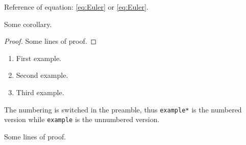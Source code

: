 \documentclass[a4paper, 11pt,
  use osf,
  use style = stream,
  title in boldface,
  theorem in new line,
  emphasize theorems,
  theorem numbering = section,
  simple name,  %
  name in link, %
]{einfart}
\numberwithin{equation}{section}
\begin{document}
\begin{emphasis}
    Reference of equation: \eqref{eq:Euler} or \cref{eq:Euler}.
\end{emphasis}

\begin{corollary}\label{cor:result}
    Some corollary.
\end{corollary}
\begin{proof}
    Some lines of proof.
\end{proof}

\begin{examples}
    \begin{enumerate}
        \item First example.
        \item Second example.
        \item Third example.
    \end{enumerate}
\end{examples}

\begin{example*}
    The numbering is switched in the preamble, thus \verb|example*| is the numbered version while \verb|example| is the unnumbered version.
\end{example*}

\begin{proof*}
    Some lines of proof.
\end{proof*}

\blinddocument

\printindex
\end{document}
